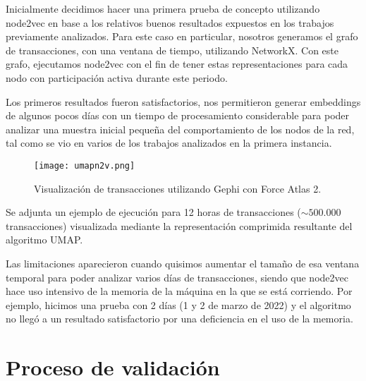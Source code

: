 \documentclass{article}
\begin{document}
Inicialmente decidimos hacer una primera prueba de concepto utilizando node2vec en base a los relativos buenos resultados expuestos en los trabajos previamente analizados. Para este caso en particular, nosotros generamos el grafo de transacciones, con una ventana de tiempo, utilizando NetworkX. Con este grafo, ejecutamos node2vec con el fin de tener estas representaciones para cada nodo con participación activa durante este periodo.

Los primeros resultados fueron satisfactorios, nos permitieron generar embeddings de algunos pocos días con un tiempo de procesamiento considerable para poder analizar una muestra inicial pequeña del comportamiento de los nodos de la red, tal como se vio en varios de los trabajos analizados en la primera instancia.

\begin{figure}[h!]
    \centering
    \texttt{[image: umapn2v.png]} %
    \caption{Visualización de transacciones utilizando Gephi con Force Atlas 2.}
    \label{fig:ejemplo}
\end{figure}
Se adjunta un ejemplo de ejecución para 12 horas de transacciones ($\sim 500.000$ transacciones) visualizada mediante la representación comprimida resultante del algoritmo UMAP.


Las limitaciones aparecieron cuando quisimos aumentar el tamaño de esa ventana temporal para poder analizar varios días de transacciones, siendo que node2vec hace uso intensivo de la memoria de la máquina en la que se está corriendo. Por ejemplo, hicimos una prueba con 2 días (1 y 2 de marzo de 2022) y el algoritmo no llegó a un resultado satisfactorio por una deficiencia en el uso de la memoria.

\section{Proceso de validación}



%
\end{document}
